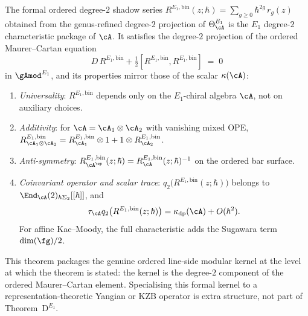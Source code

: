 \begin{theorem}
\label{thm:e1-theorem-D-modular}
The formal ordered degree-$2$ shadow series
$R^{E_1,\mathrm{bin}}(z;\hbar) = \sum_{g \geq 0}
\hbar^{2g}\,r_g(z)$
obtained from the genus-refined degree-$2$ projection of
$\Theta^{E_1}_\cA$ is the $E_1$ degree-$2$ characteristic package of
$\cA$. It satisfies the degree-$2$ projection of the ordered
Maurer--Cartan equation
\begin{equation}
\label{eq:modular-ybe}
D\,R^{E_1,\mathrm{bin}} +
\tfrac{1}{2}[R^{E_1,\mathrm{bin}}, R^{E_1,\mathrm{bin}}]
\;=\; 0
\end{equation}
in ${\gAmod}^{E_1}$, and its properties mirror those of the scalar
$\kappa(\cA)$\textup{:}
\begin{enumerate}[label=\textup{(\roman*)}]
\item \emph{Universality}\textup{:}
 $R^{E_1,\mathrm{bin}}$ depends only on the $E_1$-chiral algebra
 $\cA$, not on auxiliary choices.
\item \emph{Additivity}\textup{:} for $\cA = \cA_1 \otimes
 \cA_2$ with vanishing mixed OPE,
 $R^{E_1,\mathrm{bin}}_{\cA_1 \otimes \cA_2}
 = R^{E_1,\mathrm{bin}}_{\cA_1} \otimes 1 + 1 \otimes
 R^{E_1,\mathrm{bin}}_{\cA_2}$.
\item \emph{Anti-symmetry}\textup{:}
 $R^{E_1,\mathrm{bin}}_{\cA^{\op}}(z;\hbar)
 = R^{E_1,\mathrm{bin}}_{\cA}(z;\hbar)^{-1}$ on the ordered
 bar surface.
\item \emph{Coinvariant operator and scalar trace}\textup{:}
 $q_2\bigl(R^{E_1,\mathrm{bin}}(z;\hbar)\bigr)$ belongs to
 $\End_\cA(2)_{h\Sigma_2}[[\hbar]]$, and
 \[
  \tau_\cA q_2\bigl(R^{E_1,\mathrm{bin}}(z;\hbar)\bigr)
  =\kappa_{\mathrm{dp}}(\cA)+O(\hbar^2).
 \]
 For affine Kac--Moody, the full characteristic adds the Sugawara
 term $\dim(\fg)/2$.
\end{enumerate}
\noindent
This theorem packages the genuine ordered line-side modular kernel at
the level at which the theorem is stated: the kernel is the degree-$2$
component of the ordered Maurer--Cartan element. Specialising this
formal kernel to a representation-theoretic Yangian or KZB operator is
extra structure, not part of Theorem~$\mathrm{D}^{E_1}$.

\end{theorem}

